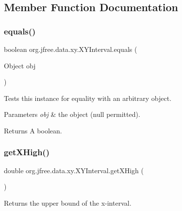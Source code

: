 \subsection{Member Function Documentation}
\mbox{\label{classorg_1_1jfree_1_1data_1_1xy_1_1_x_y_interval_a45ec9decb77607b63c6ae39dca4281e6}} 
\subsubsection{\texorpdfstring{equals()}{equals()}}
{\footnotesize\ttfamily boolean org.\+jfree.\+data.\+xy.\+X\+Y\+Interval.\+equals (\begin{DoxyParamCaption}\item[{Object}]{obj }\end{DoxyParamCaption})}

Tests this instance for equality with an arbitrary object.


\begin{DoxyParams}{Parameters}
{\em obj} & the object ({\ttfamily null} permitted).\\
\hline
\end{DoxyParams}
\begin{DoxyReturn}{Returns}
A boolean. 
\end{DoxyReturn}
\mbox{\label{classorg_1_1jfree_1_1data_1_1xy_1_1_x_y_interval_a0e09662e6aefb896e76eda0e29cad13b}} 
\subsubsection{\texorpdfstring{get\+X\+High()}{getXHigh()}}
{\footnotesize\ttfamily double org.\+jfree.\+data.\+xy.\+X\+Y\+Interval.\+get\+X\+High (\begin{DoxyParamCaption}{ }\end{DoxyParamCaption})}

Returns the upper bound of the x-\/interval.

